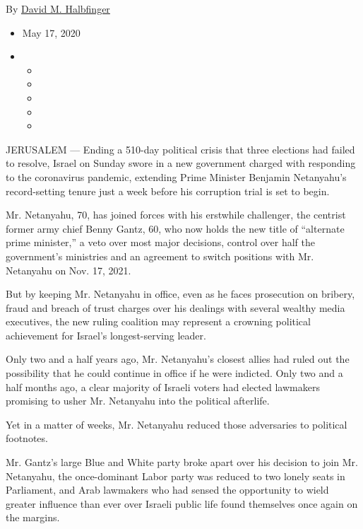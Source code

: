 By \href{https://www.nytimes.com/by/david-m-halbfinger}{David M.
Halbfinger}

\begin{itemize}
\item
  May 17, 2020
\item
  \begin{itemize}
  \item
  \item
  \item
  \item
  \item
  \end{itemize}
\end{itemize}

JERUSALEM --- Ending a 510-day political crisis that three elections had
failed to resolve, Israel on Sunday swore in a new government charged
with responding to the coronavirus pandemic, extending Prime Minister
Benjamin Netanyahu's record-setting tenure just a week before his
corruption trial is set to begin.

Mr. Netanyahu, 70, has joined forces with his erstwhile challenger, the
centrist former army chief Benny Gantz, 60, who now holds the new title
of ``alternate prime minister,'' a veto over most major decisions,
control over half the government's ministries and an agreement to switch
positions with Mr. Netanyahu on Nov. 17, 2021.

But by keeping Mr. Netanyahu in office, even as he faces prosecution on
bribery, fraud and breach of trust charges over his dealings with
several wealthy media executives, the new ruling coalition may represent
a crowning political achievement for Israel's longest-serving leader.

Only two and a half years ago, Mr. Netanyahu's closest allies had ruled
out the possibility that he could continue in office if he were
indicted. Only two and a half months ago, a clear majority of Israeli
voters had elected lawmakers promising to usher Mr. Netanyahu into the
political afterlife.

Yet in a matter of weeks, Mr. Netanyahu reduced those adversaries to
political footnotes.

Mr. Gantz's large Blue and White party broke apart over his decision to
join Mr. Netanyahu, the once-dominant Labor party was reduced to two
lonely seats in Parliament, and Arab lawmakers who had sensed the
opportunity to wield greater influence than ever over Israeli public
life found themselves once again on the margins.

